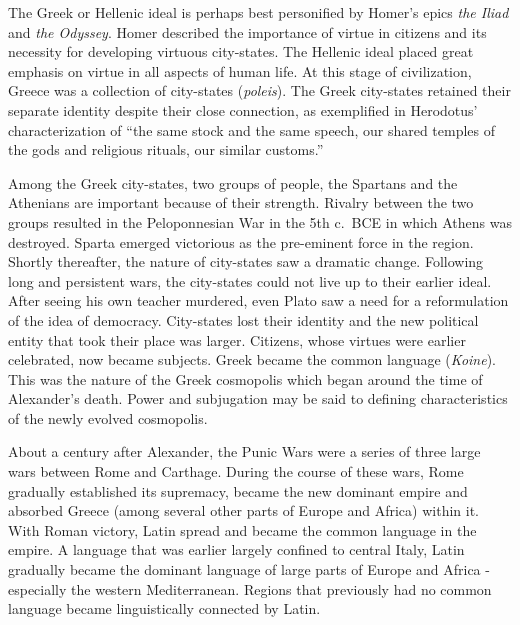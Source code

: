 The Greek or Hellenic ideal is perhaps best personified by Homer’s epics {\it the Iliad} and {\it the Odyssey}. Homer described the importance of virtue in citizens and its necessity for developing virtuous city-states. The Hellenic ideal placed great emphasis on virtue in all aspects of human life. At this stage of civilization, Greece was a collection of city-states ({\it poleis}). The Greek city-states retained their separate identity despite their close connection, as exemplified in Herodotus’ characterization of “the same stock and the same speech, our shared temples of the gods and religious rituals, our similar customs.”

Among the Greek city-states, two groups of people, the Spartans and the Athenians are important because of their strength. Rivalry between the two groups resulted in the Peloponnesian War in the 5th c.\ BCE in which Athens was destroyed. Sparta emerged victorious as the pre-eminent force in the region. Shortly thereafter, the nature of city-states saw a dramatic change. Following long and persistent wars, the city-states could not live up to their earlier ideal. After seeing his own teacher murdered, even Plato saw a need for a reformulation of the idea of democracy. City-states lost their identity and the new political entity that took their place was larger. Citizens, whose virtues were earlier celebrated, now became subjects. Greek became the common language ({\sl Koine}). This was the nature of the Greek cosmopolis which began around the time of Alexander’s death. Power and subjugation may be said to defining characteristics of the newly evolved cosmopolis.

About a century after Alexander, the Punic Wars were a series of three large wars between Rome and Carthage. During the course of these wars, Rome gradually established its supremacy, became the new dominant empire and absorbed Greece (among several other parts of Europe and Africa) within it. With Roman victory, Latin spread and became the common language in the empire. A language that was earlier largely confined to central Italy, Latin gradually became the dominant language of large parts of Europe and Africa - especially the western Mediterranean. Regions that previously had no common language became linguistically connected by Latin.

